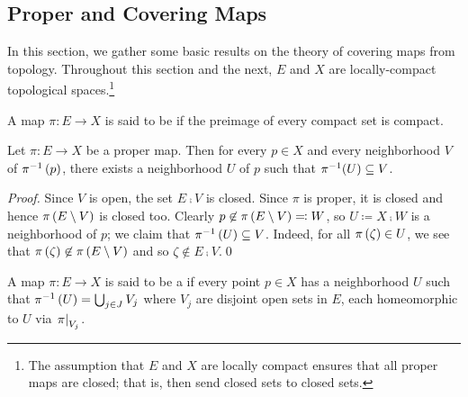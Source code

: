 \documentclass[../Moduli_Spaces_of_Riemann_Surfaces.tex]{subfiles}
\begin{document}
    \subsection{Proper and Covering Maps}
    In this section, we gather some basic results on the theory of covering maps from topology. Throughout this section and the next, $E$ and $X$ are locally-compact topological spaces.\footnote{The assumption that $E$ and $X$ are locally compact ensures that all proper maps are closed; that is, then send closed sets to closed sets.}
    \begin{definition}
        A map $\pi:E\to X$ is said to be  if the preimage of every compact set is compact.
    \end{definition}
    \begin{proposition}\label{RS:prp:proper_give_neighborhoods}
        Let $\pi:E\to X$ be a proper map. Then for every $p\in X$ and every neighborhood $V$ of $\pi^{-1}\left(p\right)$, there exists a neighborhood $U$ of $p$ such that $\pi^{-1}\!\left(U\right)\subseteq V$.
    \end{proposition}
    \begin{proof}
        Since $V$ is open, the set $E\comp V$ is closed. Since $\pi$ is proper, it is closed and hence $\pi\left(E\setminus V\right)$ is closed too. Clearly $p\not\in\pi\left(E\setminus V\right)\eqqcolon W$, so $U\coloneqq X\comp W$ is a neighborhood of $p$; we claim that $\pi^{-1}\left(U\right)\subseteq V$. Indeed, for all $\pi\left(\zeta\right)\in U$, we see that $\pi\left(\zeta\right)\not\in\pi\left(E\setminus V\right)$ and so $\zeta\not\in E\comp V$.\qed
    \end{proof}
    \begin{definition}
        A map $\pi:E\to X$ is said to be a  if every point $p\in X$ has a neighborhood $U$ such that $\pi^{-1}\left(U\right)=\bigcup_{j\in J}V_j$ where $V_j$ are disjoint open sets in $E$, each homeomorphic to $U$ via $\left.\pi\right|_{V_j}$.
    \end{definition}
\end{document}
